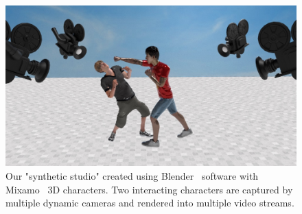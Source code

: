 \begin{figure}[tbh]
\centering
\includegraphics[width=\linewidth]{./images/Blender_studio.jpg}
\setlength{\abovecaptionskip}{-5pt plus 3pt minus 2pt}
\setlength{\belowcaptionskip}{-5pt plus 3pt minus 2pt}
\caption{Our "synthetic studio" created using Blender~\cite{blender} software with Mixamo~\cite{mixamo} 3D characters.
Two interacting characters are captured by multiple dynamic cameras and rendered into multiple video streams.}
\label{fig:blender_studio}
\end{figure}